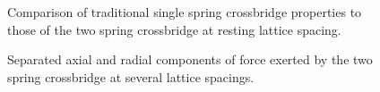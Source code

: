 \documentclass[]{article}
\begin{document}
\begin{figure}[p]
    \begin{center}
    \label{fig:one_spring_comparison}
    \caption{
        Comparison of traditional single spring crossbridge properties to those of the two spring crossbridge at resting lattice spacing.}
    \end{center}
\end{figure}

\begin{figure}[p]
    \begin{center}
    \label{fig:force_components}
    \caption{
        Separated axial and radial components of force exerted by the two spring crossbridge at several lattice spacings.}
    \end{center}
\end{figure}






\end{document}
